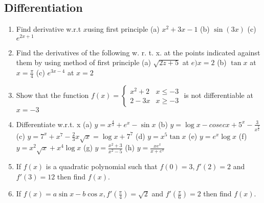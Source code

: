 \documentclass[14pt]{article}
\begin{document}
\begin{multicols}{2}
\section{Differentiation}
\noindent
\begin{enumerate}[resume]


\item Find derivative w.r.t $x$using first principle (a) $x^2+3x-1$ (b) $\sin (3x)$ (c) $e^{2x+1}$ 

\item Find the derivatives of the following w. r. t. x. at the points indicated against them by using method of first principle (a) $\sqrt{2z+5}$ at $e) x=2$ (b) $\tan x$ at $x = \frac{\pi}{4}$ (c) $e^{3x-4}$ at $x=2$

\item Show that the function $f(x) =  \begin{cases} 
        x^2+2 & x \leq -3 \\
        2-3x    &  x \geq -3 
   \end{cases}$ is not differentiable at $x=-3$

\item Differentiate w.r.t. x (a) $y=x^\frac{4}{3}+e^x-\sin x$ (b) $y=\log x - cosec x + 5^x - \frac{3}{x^\frac{3}{2}}$ (c) $y=7^x+x^7-\frac{2}{3}x\sqrt{x} = \log x + 7^7$ (d) $y=x^5\tan x $ (e) $y = e^x \log x$ (f) $y=x^2\sqrt{x} + x^4\log x$ (g) $y=\frac{x^2+3}{x^2-5}$ (h) $y=\frac{xe^x}{x+e^x}$

\item  If $f(x)$ is a quadratic polynomial such that $f(0) = 3, f '(2) = 2$ and $f '(3) = 12$
then find $f(x)$.

\item  If $f(x)=a\sin x - b\cos x , f'\left(\frac{\pi}{4}\right)=\sqrt{2}$ and $f'\left(\frac{\pi}{6}\right)=2$
then find $f(x)$.

\end{enumerate} 


\end{multicols}
 
\end{document}

